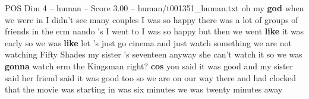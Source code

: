 \begin{textsample}{POS Dim 4 – human – Score 3.00 – human/t001351\_human.txt}  \label{ex:f4_pos_014}
oh my \textbf{god} when we were in I didn't see many couples I was so happy there was a lot of groups of friends in the erm nando 's I went to I was so happy but then we went \textbf{like} it was early so we was \textbf{like} let 's just go cinema and just watch something we are not watching Fifty Shades my sister 's seventeen anyway she can't watch it so we was \textbf{gonna} watch erm the Kingsman right? \textbf{cos} you said it was good and my sister said her friend said it was good too so we are on our way there and had clocked that the movie was starting in was six minutes we was twenty minutes away

\end{textsample}
